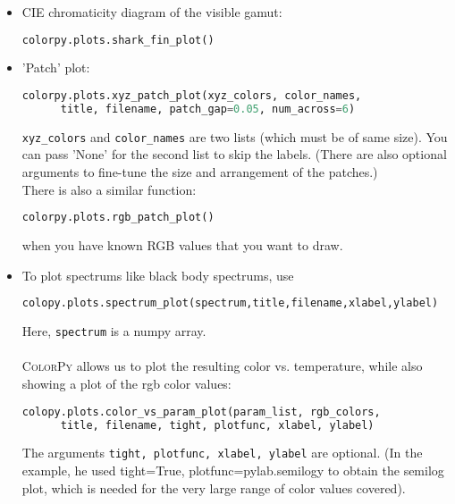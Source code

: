 \begin{itemize}
\item CIE chromaticity diagram of the visible gamut:
\begin{lstlisting}[style=FormattedNumber, language=python, frame=none]
   colorpy.plots.shark_fin_plot()
\end{lstlisting}

\item 'Patch' plot:
\begin{lstlisting}[style=FormattedNumber, language=python, frame=none]
   colorpy.plots.xyz_patch_plot(xyz_colors, color_names, 
      title, filename, patch_gap=0.05, num_across=6)
\end{lstlisting}
\texttt{xyz\_colors} and \texttt{color\_names} are two lists (which must be of same size).
You can pass 'None' for the second list to skip the labels. (There are also optional arguments to fine-tune
the size and arrangement of the patches.) \\
There is also a similar function:
\begin{lstlisting}[style=FormattedNumber, language=python, frame=none]
   colorpy.plots.rgb_patch_plot()
\end{lstlisting}
when you have known RGB values that you want to draw.

\item To plot spectrums like black body spectrums, use
\begin{lstlisting}[style=FormattedNumber, language=python, frame=none]
   colopy.plots.spectrum_plot(spectrum,title,filename,xlabel,ylabel)
\end{lstlisting}
Here, \texttt{spectrum} is a numpy array.
\\
\\
\textsc{ColorPy} allows us to plot the resulting color vs. temperature, while also showing a plot
of the rgb color values:
\begin{lstlisting}[style=FormattedNumber, language=python, frame=none]
   colopy.plots.color_vs_param_plot(param_list, rgb_colors, 
      title, filename, tight, plotfunc, xlabel, ylabel)
\end{lstlisting}
The arguments \texttt{tight, plotfunc, xlabel, ylabel} are optional. (In the example, he used
tight=True, plotfunc=pylab.semilogy to obtain the semilog plot, which is needed for the very large range
of color values covered).
\end{itemize}
